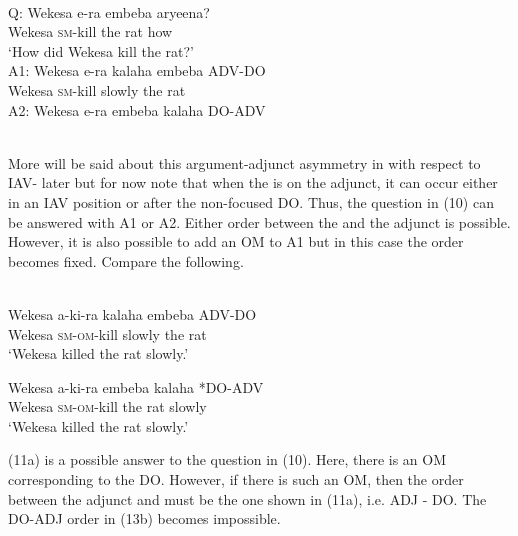 \documentclass[output=paper,newtxmath,modfonts,nonflat,draft]{langsci/langscibook}
\begin{document}
\ea\label{ex:selvanathan:10}
\\

Q: \gll Wekesa   e-ra     embeba   aryeena? \\
	Wekesa   \textsc{sm}{}-kill   {the rat}    how \\
\glt \-\hspace{0.5cm}`How did Wekesa kill the rat?' \\

A1: \gll Wekesa    e-ra   kalaha   embeba ADV-DO \\
Wekesa   \textsc{sm}{}-kill   slowly    {the rat} \\

A2: \gll Wekesa    e-ra   embeba   kalaha   DO-ADV\\
\\
\z

More will be said about this argument-adjunct asymmetry in  with respect to IAV- later but for now note that when the  is on the adjunct, it can occur either in an IAV position or after the non-focused DO. Thus, the question in (10) can be answered with A1 or A2. Either order between the  and the adjunct is possible. However, it is also possible to add an OM to A1 but in this case the order becomes fixed. Compare the following.

\ea\label{ex:selvanathan:11}
\\
\ea\label{ex:selvanathan:11a}
\gll Wekesa  a-ki-ra   kalaha   embeba  ADV-DO\\
Wekesa  \textsc{sm}{}-\textsc{om}{}-kill  slowly    {the rat}\\
\glt `Wekesa killed the rat slowly.' 

\ex\label{ex:selvanathan:11b}
\gll *Wekesa  a-ki-ra   embeba  kalaha        *DO-ADV\\
Wekesa  \textsc{sm}{}-\textsc{om}{}-kill  {the rat}    slowly\\
\glt `Wekesa killed the rat slowly.'
\z
\z

(11a) is a possible answer to the question in (10). Here, there is an OM corresponding to the DO. However, if there is such an OM, then the order between the adjunct and  must be the one shown in (11a), i.e. ADJ - DO. The DO-ADJ order in (13b) becomes impossible.   
\end{document}
